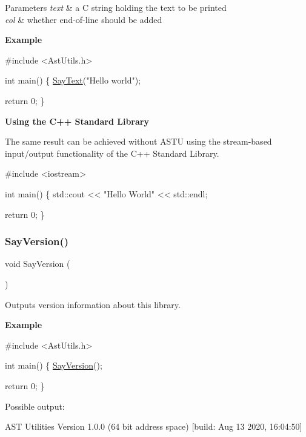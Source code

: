 \begin{DoxyParams}{Parameters}
{\em text} & a C string holding the text to be printed \\
\hline
{\em eol} & whether \textquotesingle{}end-\/of-\/line\textquotesingle{} should be added\\
\hline
\end{DoxyParams}
{\bfseries Example}


\begin{DoxyCode}
\textcolor{preprocessor}{#include <AstUtils.h>}

\textcolor{keywordtype}{int} main()
\{
  \hyperlink{group__io__group_ga82cdf45375c3b92b2a60c3d9b55d682f}{SayText}(\textcolor{stringliteral}{"Hello world"});

  \textcolor{keywordflow}{return} 0;
\}
\end{DoxyCode}


{\bfseries Using the C++ Standard Library}

The same result can be achieved without A\+S\+TU using the stream-\/based input/output functionality of the C++ Standard Library.


\begin{DoxyCode}
\textcolor{preprocessor}{#include <iostream>}

\textcolor{keywordtype}{int} main()
\{
  std::cout << \textcolor{stringliteral}{"Hello World"} << std::endl;

  \textcolor{keywordflow}{return} 0;
\}
\end{DoxyCode}
 \mbox{\label{group__io__group_gaccd19a10653fad0734fe384cd6d7ba53}} 
\subsubsection{\texorpdfstring{Say\+Version()}{SayVersion()}}
{\footnotesize\ttfamily void Say\+Version (\begin{DoxyParamCaption}{ }\end{DoxyParamCaption})}

Outputs version information about this library.

{\bfseries Example}


\begin{DoxyCode}
\textcolor{preprocessor}{#include <AstUtils.h>}

\textcolor{keywordtype}{int} main()
\{
  \hyperlink{group__io__group_gaccd19a10653fad0734fe384cd6d7ba53}{SayVersion}();

  \textcolor{keywordflow}{return} 0;
\}
\end{DoxyCode}


Possible output\+: 
\begin{DoxyCode}
AST Utilities Version 1.0.0 (64 bit address space) [build: Aug 13 2020, 16:04:50]
\end{DoxyCode}
 